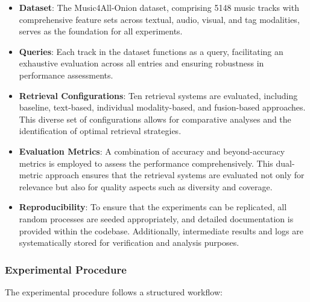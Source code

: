 \documentclass[sigconf]{acmart}
\begin{document}
\begin{itemize}
    \item \textbf{Dataset}: The Music4All-Onion dataset, comprising 5148 music tracks with comprehensive feature sets across textual, audio, visual, and tag modalities, serves as the foundation for all experiments.
    
    \item \textbf{Queries}: Each track in the dataset functions as a query, facilitating an exhaustive evaluation across all entries and ensuring robustness in performance assessments.
    
    \item \textbf{Retrieval Configurations}: Ten retrieval systems are evaluated, including baseline, text-based, individual modality-based, and fusion-based approaches. This diverse set of configurations allows for comparative analyses and the identification of optimal retrieval strategies.
    
    \item \textbf{Evaluation Metrics}: A combination of accuracy and beyond-accuracy metrics is employed to assess the performance comprehensively. This dual-metric approach ensures that the retrieval systems are evaluated not only for relevance but also for quality aspects such as diversity and coverage.
    
    \item \textbf{Reproducibility}: To ensure that the experiments can be replicated, all random processes are seeded appropriately, and detailed documentation is provided within the codebase. Additionally, intermediate results and logs are systematically stored for verification and analysis purposes.
\end{itemize}

\subsubsection{Experimental Procedure}

The experimental procedure follows a structured workflow:
\end{document}
